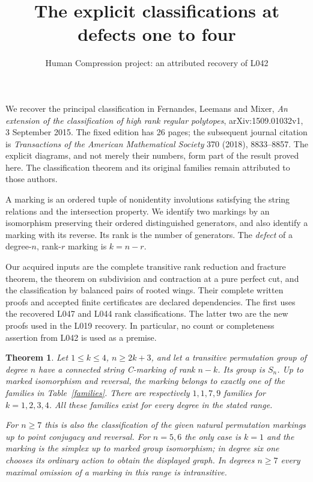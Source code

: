 \documentclass[11pt,a4paper]{article}
\title{The explicit classifications at defects one to four}
\author{Human Compression project: an attributed recovery of L042}
\date{}
\newtheorem{theorem}{Theorem}
\begin{document}
\maketitle

We recover the principal classification in Fernandes, Leemans and Mixer,
\emph{An extension of the classification of high rank regular polytopes},
arXiv:1509.01032v1, 3 September 2015. The fixed edition has 26 pages;
the subsequent journal citation is \emph{Transactions of the American
Mathematical Society} 370 (2018), 8833--8857. The explicit diagrams,
and not merely their numbers, form part of the result proved here.
The classification theorem and its original families remain attributed
to those authors.

A marking is an ordered tuple of nonidentity involutions satisfying
the string relations and the intersection property. We identify two
markings by an isomorphism preserving their ordered distinguished
generators, and also identify a marking with its reverse. Its rank is
the number of generators. The \emph{defect} of a degree-$n$, rank-$r$
marking is $k=n-r$.

Our acquired inputs are the complete transitive rank reduction and
fracture theorem, the theorem on subdivision and contraction at a pure
perfect cut, and the classification by balanced pairs of rooted wings.
Their complete written proofs and accepted finite certificates are
declared dependencies. The first uses the recovered L047 and L044 rank
classifications. The latter two are the new proofs used in the L019
recovery. In particular, no count or completeness assertion from L042
is used as a premise.

\begin{theorem}\label{main}
Let $1\le k\le4$, $n\ge2k+3$, and let a transitive permutation group
of degree $n$ have a connected string C-marking of rank $n-k$.
Its group is $S_n$. Up to marked isomorphism and reversal, the marking
belongs to exactly one of the families in Table~\ref{families}.
There are respectively $1,1,7,9$ families for $k=1,2,3,4$.
All these families exist for every degree in the stated range.

For $n\ge7$ this is also the classification of the given natural
permutation markings up to point conjugacy and reversal. For $n=5,6$
the only case is $k=1$ and the marking is the simplex up to marked
group isomorphism; in degree six one chooses its ordinary action
to obtain the displayed graph. In degrees $n\ge7$ every maximal
omission of a marking in this range is intransitive.
\end{theorem}
\end{document}
